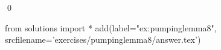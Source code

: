 
\begin{ex} 
  \label{ex:pumpinglemma8}
  
  \qed
\end{ex} 
\begin{python0}
from solutions import *
add(label="ex:pumpinglemma8",
    srcfilename='exercises/pumpinglemma8/answer.tex') 
\end{python0}
